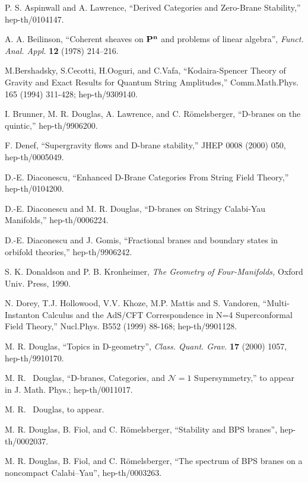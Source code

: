 \documentclass[a4paper,12pt]{amsart}
\numberwithin{equation}{section}
\theoremstyle{plain}
\theoremstyle{definition}
\def\Bbb#1{{\fam\black\relax#1}}
\def\Bbb{\bf}
\def\cal{\mathcal}
\def\BP{\Bbb{P}}
\def\CN{{\cal N}}
\begin{document}
\begin{thebibliography}{10}

P. S. Aspinwall and A. Lawrence,
``Derived Categories and Zero-Brane Stability,''
hep-th/0104147.

A. A. Beilinson, ``Coherent sheaves on $\BP^n$ and
  problems of linear algebra'', {\it Funct. Anal. Appl.}
  {\bf 12} (1978) 214--216.

M.Bershadsky, S.Cecotti, H.Ooguri, and C.Vafa,
``Kodaira-Spencer Theory of Gravity and 
Exact Results for Quantum String Amplitudes,''
Comm.Math.Phys. 165 (1994) 311-428; hep-th/9309140.

I. Brunner, M. R. Douglas, A. Lawrence, and C. R\"omelsberger,
  ``D-branes on the quintic,'' hep-th/9906200.

F. Denef, ``Supergravity flows and D-brane stability,''
JHEP 0008 (2000) 050, hep-th/0005049.

D.-E. Diaconescu,
``Enhanced D-Brane Categories From String Field Theory,''
hep-th/0104200.

D.-E. Diaconescu and M. R. Douglas, ``D-branes on Stringy
Calabi-Yau Manifolds,'' hep-th/0006224.

D.-E. Diaconescu and J. Gomis, ``Fractional branes and boundary
  states in orbifold theories,'' hep-th/9906242.

S. K. Donaldson and P. B. Kronheimer, {\it The Geometry
of Four-Manifolds,} Oxford Univ. Press, 1990.

N. Dorey, T.J. Hollowood, V.V. Khoze, M.P. Mattis and S. Vandoren,
``Multi-Instanton Calculus and the AdS/CFT Correspondence 
in N=4 Superconformal Field Theory,''
Nucl.Phys. B552 (1999) 88-168; hep-th/9901128.

M. R. Douglas, ``Topics in D-geometry'',
  {\it Class. Quant. Grav.} {\bf 17} (2000) 1057, hep-th/9910170.

M. R.~ Douglas, ``D-branes, Categories, and $\CN=1$ Supersymmetry,''
to appear in J. Math. Phys.; hep-th/0011017.

M. R.~ Douglas, to appear.

M. R. Douglas, B. Fiol, and C. R\"omelsberger,
  ``Stability and BPS branes'', hep-th/0002037.

M. R. Douglas, B. Fiol, and C. R\"omelsberger, 
  ``The spectrum of BPS branes on a noncompact Calabi--Yau'', 
  hep-th/0003263.


\end{thebibliography}
\end{document}
